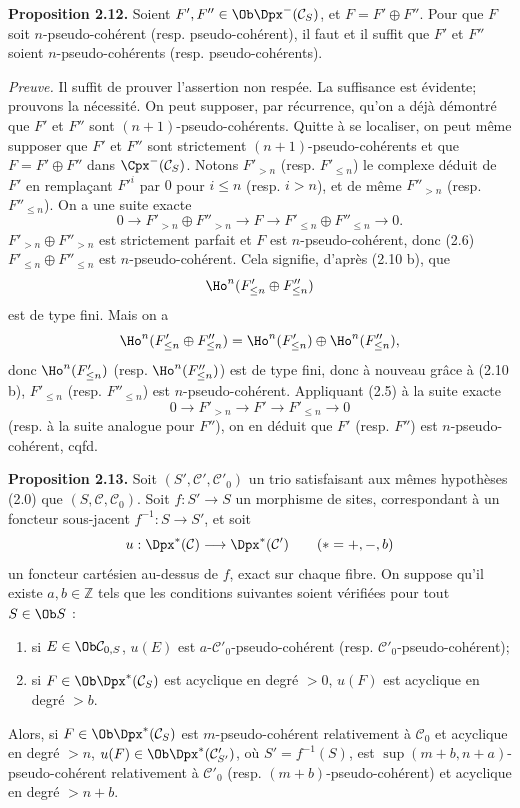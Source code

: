 \documentclass[11pt]{article}
\begin{document}
\textbf{Proposition 2.12.} Soient \(F',F''\in\Ob\Dpx^-(\mathcal C_S)\), et \(F=F'\oplus F''\). Pour que \(F\) soit \(n\)-pseudo-cohérent (resp. pseudo-cohérent), il faut et il suffit que \(F'\) et \(F''\) soient \(n\)-pseudo-cohérents (resp. pseudo-cohérents).

\emph{Preuve.} Il suffit de prouver l'assertion non respée. La suffisance est évidente; prouvons la nécessité. On peut supposer, par récurrence, qu'on a déjà démontré que \(F'\) et \(F''\) sont \((n+1)\)-pseudo-cohérents. Quitte à se localiser, on peut même supposer que \(F'\) et \(F''\) sont strictement \((n+1)\)-pseudo-cohérents et que \(F=F'\oplus F''\) dans \(\Cpx^-(\mathcal C_S)\). Notons \(F'_{>n}\) (resp. \(F'_{\leq n}\)) le complexe déduit de \(F'\) en remplaçant \(F'^i\) par \(0\) pour \(i\leq n\) (resp. \(i>n\)), et de même \(F''_{>n}\) (resp. \(F''_{\leq n}\)). On a une suite exacte
\[
  0\longrightarrow F'_{>n}\oplus F''_{>n}\longrightarrow F
  \longrightarrow F'_{\leq n}\oplus F''_{\leq n}\longrightarrow 0 .
\]
\(F'_{>n}\oplus F''_{>n}\) est strictement parfait et \(F\) est \(n\)-pseudo-cohérent, donc (2.6) \(F'_{\leq n}\oplus F''_{\leq n}\) est \(n\)-pseudo-cohérent. Cela signifie, d'après (2.10 b), que
\[
  \Ho^n(F'_{\leq n}\oplus F''_{\leq n})
\]
est de type fini. Mais on a
\[
  \Ho^n(F'_{\leq n}\oplus F''_{\leq n})
  =\Ho^n(F'_{\leq n})\oplus\Ho^n(F''_{\leq n}),
\]
donc \(\Ho^n(F'_{\leq n})\) (resp. \(\Ho^n(F''_{\leq n})\)) est de type fini, donc à nouveau grâce à (2.10 b), \(F'_{\leq n}\) (resp. \(F''_{\leq n}\)) est \(n\)-pseudo-cohérent. Appliquant (2.5) à la suite exacte
\[
  0\longrightarrow F'_{>n}\longrightarrow F'\longrightarrow F'_{\leq n}\longrightarrow 0
\]
(resp. à la suite analogue pour \(F''\)), on en déduit que \(F'\) (resp. \(F''\)) est \(n\)-pseudo-cohérent, cqfd.

\textbf{Proposition 2.13.} Soit \((S',\mathcal C',\mathcal C'_0)\) un trio satisfaisant aux mêmes hypothèses (2.0) que \((S,\mathcal C,\mathcal C_0)\). Soit \(f:S'\to S\) un morphisme de sites, correspondant à un foncteur sous-jacent \(f^{-1}:S\to S'\), et soit
\[
  u:\Dpx^*(\mathcal C)\longrightarrow \Dpx^*(\mathcal C')\qquad (*=+,-,b)
\]
un foncteur cartésien au-dessus de \(f\), exact sur chaque fibre. On suppose qu'il existe \(a,b\in\mathbb Z\) tels que les conditions suivantes soient vérifiées pour tout \(S\in\Ob S\) :
\begin{enumerate}[label=(\roman*)]
\item si \(E\in\Ob\mathcal C_{0,S}\), \(u(E)\) est \(a\)-\(\mathcal C'_0\)-pseudo-cohérent (resp. \(\mathcal C'_0\)-pseudo-cohérent);
\item si \(F\in\Ob\Dpx^*(\mathcal C_S)\) est acyclique en degré \(>0\), \(u(F)\) est acyclique en degré \(>b\).
\end{enumerate}
Alors, si \(F\in\Ob\Dpx^*(\mathcal C_S)\) est \(m\)-pseudo-cohérent relativement à \(\mathcal C_0\) et acyclique en degré \(>n\), \(u(F)\in\Ob\Dpx^*(\mathcal C'_{S'})\), où \(S'=f^{-1}(S)\), est \(\sup(m+b,n+a)\)-pseudo-cohérent relativement à \(\mathcal C'_0\) (resp. \((m+b)\)-pseudo-cohérent) et acyclique en degré \(>n+b\).
\end{document}
